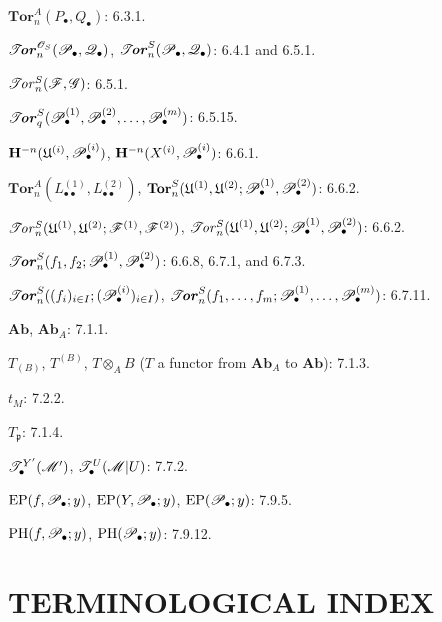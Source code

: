 \begin{flushleft}
$\mathbf{Tor}_n^A(P_\bullet,Q_\bullet)$: 6.3.1.

\medskip
$\boldsymbol{\mathscr{T}\!\mathit{or}}_n^{\mathscr{O}_S}(\mathscr{P}_\bullet,\mathscr{Q}_\bullet)$,
$\boldsymbol{\mathscr{T}\!\mathit{or}}_n^S(\mathscr{P}_\bullet,\mathscr{Q}_\bullet)$: 6.4.1 and 6.5.1.

\medskip
$\mathscr{T}\!\mathit{or}_n^S(\mathscr{F},\mathscr{G})$: 6.5.1.

\medskip
$\boldsymbol{\mathscr{T}\!\mathit{or}}_q^S(\mathscr{P}_\bullet^{(1)},\mathscr{P}_\bullet^{(2)},\ldots,
\mathscr{P}_\bullet^{(m)})$: 6.5.15.

\medskip
$\mathbf H^{-n}(\mathfrak U^{(i)},\mathscr{P}_\bullet^{(i)})$,
$\mathbf H^{-n}(X^{(i)},\mathscr{P}_\bullet^{(i)})$: 6.6.1.

\medskip
$\mathbf{Tor}_n^A(L_{\bullet\bullet}^{(1)},L_{\bullet\bullet}^{(2)})$,
$\mathbf{Tor}_n^S(\mathfrak U^{(1)},\mathfrak U^{(2)};
\mathscr{P}_\bullet^{(1)},\mathscr{P}_\bullet^{(2)})$: 6.6.2.

\medskip
$\mathscr{T}\!\mathit{or}_n^S(\mathfrak U^{(1)},\mathfrak U^{(2)};
\mathscr{F}^{(1)},\mathscr{F}^{(2)})$,
$\mathscr{T}\!\mathit{or}_n^S(\mathfrak U^{(1)},\mathfrak U^{(2)};
\mathscr{P}_\bullet^{(1)},\mathscr{P}_\bullet^{(2)})$: 6.6.2.

\medskip
$\boldsymbol{\mathscr{T}\!\mathit{or}}_n^S(f_1,f_2;\mathscr{P}_\bullet^{(1)},
\mathscr{P}_\bullet^{(2)})$: 6.6.8, 6.7.1, and 6.7.3.

\medskip
$\boldsymbol{\mathscr{T}\!\mathit{or}}_n^S((f_i)_{i\in I};(\mathscr{P}_\bullet^{(i)})_{i\in I})$,
$\boldsymbol{\mathscr{T}\!\mathit{or}}_n^S(f_1,\ldots,f_m;\mathscr{P}_\bullet^{(1)},\ldots,
\mathscr{P}_\bullet^{(m)})$: 6.7.11.

\medskip
$\boldsymbol{Ab}$, $\boldsymbol{Ab}_A$: 7.1.1.

\medskip
$T_{(B)}$, $T^{(B)}$, $T\otimes_A B$
($T$ a functor from $\boldsymbol{Ab}_A$ to $\boldsymbol{Ab}$): 7.1.3.

\medskip
$t_M$: 7.2.2.

\medskip
$T_{\mathfrak p}$: 7.1.4.

\medskip
$\mathscr{T}_\bullet^{Y'}(\mathscr{M}')$,
$\mathscr{T}_\bullet^U(\mathscr{M}|U)$: 7.7.2.

\medskip
$\operatorname{EP}(f,\mathscr{P}_\bullet;y)$,
$\operatorname{EP}(Y,\mathscr{P}_\bullet;y)$,
$\operatorname{EP}(\mathscr{P}_\bullet;y)$: 7.9.5.

\medskip
$\operatorname{PH}(f,\mathscr{P}_\bullet;y)$,
$\operatorname{PH}(\mathscr{P}_\bullet;y)$: 7.9.12.
\end{flushleft}

\clearpage
{}
\section*{TERMINOLOGICAL INDEX}

